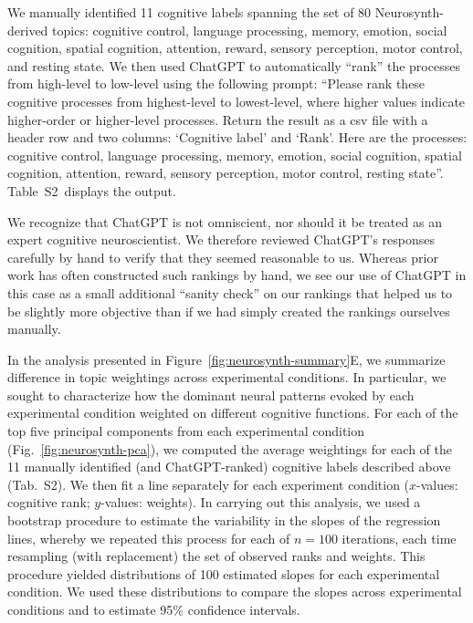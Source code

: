\documentclass[english, 11pt]{article}
\newcommand{\topicTags}{S2}
\begin{document}
We manually identified 11 cognitive labels spanning the set of 80
Neurosynth-derived topics: cognitive control, language processing, memory,
emotion, social cognition, spatial cognition, attention, reward, sensory
perception, motor control, and resting state. We then used ChatGPT to
automatically ``rank'' the processes from high-level to low-level using the
following prompt: ``Please rank these cognitive processes from highest-level to
lowest-level, where higher values indicate higher-order or higher-level
processes. Return the result as a csv file with a header row and two columns:
`Cognitive label' and `Rank'. Here are the processes: cognitive control,
language processing, memory, emotion, social cognition, spatial cognition,
attention, reward, sensory perception, motor control, resting state''.
Table~\topicTags~displays the output.

We recognize that ChatGPT is not omniscient, nor should it be treated as an
expert cognitive neuroscientist. We therefore reviewed ChatGPT's responses
carefully by hand to verify that they seemed reasonable to us. Whereas prior
work has often constructed such rankings by hand, we see our use of ChatGPT in
this case as a small additional ``sanity check'' on our rankings that helped us
to be slightly more objective than if we had simply created the rankings
ourselves manually.

In the analysis presented in Figure~\ref{fig:neurosynth-summary}E, we summarize
difference in topic weightings across experimental conditions. In particular,
we sought to characterize how the dominant neural patterns evoked by each
experimental condition weighted on different cognitive functions. For each of
the top five principal components from each experimental condition
(Fig.~\ref{fig:neurosynth-pca}), we computed the average weightings for each of
the 11 manually identified (and ChatGPT-ranked) cognitive labels described
above (Tab.~\topicTags). We then fit a line separately for each experiment
condition ($x$-values: cognitive rank; $y$-values: weights). In carrying out
this analysis, we used a bootstrap procedure to estimate the variability in the
slopes of the regression lines, whereby we repeated this process for each of $n
= 100$ iterations, each time resampling (with replacement) the set of observed
ranks and weights. This procedure yielded distributions of 100 estimated slopes
for each experimental condition. We used these distributions to compare the
slopes across experimental conditions and to estimate 95\% confidence intervals.
\end{document}
